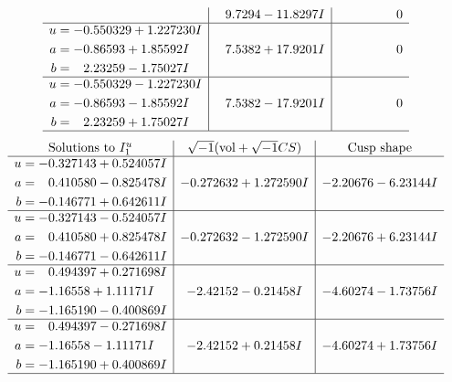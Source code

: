 \documentclass[1p]{elsarticle_modified}
\theoremstyle{definition}
\newcommand{\I}{\sqrt{-1}}
\begin{document}
$$\begin{array}{c|c|c}
 & \phantom{-}9.7294 - 11.8297 I & \phantom{-0.000000 } 0 \\ \hline\begin{aligned}
u &= -0.550329 + 1.227230 I \\
a &= -0.86593 + 1.85592 I \\
b &= \phantom{-}2.23259 - 1.75027 I\end{aligned}
 & \phantom{-}7.5382 + 17.9201 I & \phantom{-0.000000 } 0 \\ \hline\begin{aligned}
u &= -0.550329 - 1.227230 I \\
a &= -0.86593 - 1.85592 I \\
b &= \phantom{-}2.23259 + 1.75027 I\end{aligned}
 & \phantom{-}7.5382 - 17.9201 I & \phantom{-0.000000 } 0\\
 \hline 
 \end{array}$$\newpage$$\begin{array}{c|c|c}  
\text{Solutions to }I^u_{1}& \I (\text{vol} + \sqrt{-1}CS) & \text{Cusp shape}\\
 \hline 
\begin{aligned}
u &= -0.327143 + 0.524057 I \\
a &= \phantom{-}0.410580 - 0.825478 I \\
b &= -0.146771 + 0.642611 I\end{aligned}
 & -0.272632 + 1.272590 I & -2.20676 - 6.23144 I \\ \hline\begin{aligned}
u &= -0.327143 - 0.524057 I \\
a &= \phantom{-}0.410580 + 0.825478 I \\
b &= -0.146771 - 0.642611 I\end{aligned}
 & -0.272632 - 1.272590 I & -2.20676 + 6.23144 I \\ \hline\begin{aligned}
u &= \phantom{-}0.494397 + 0.271698 I \\
a &= -1.16558 + 1.11171 I \\
b &= -1.165190 - 0.400869 I\end{aligned}
 & -2.42152 - 0.21458 I & -4.60274 - 1.73756 I \\ \hline\begin{aligned}
u &= \phantom{-}0.494397 - 0.271698 I \\
a &= -1.16558 - 1.11171 I \\
b &= -1.165190 + 0.400869 I\end{aligned}
 & -2.42152 + 0.21458 I & -4.60274 + 1.73756 I\\
 \hline 
 \end{array}$$\newpage\newpage\renewcommand{\arraystretch}{1}
\end{document}
